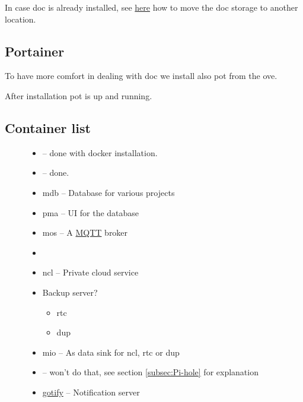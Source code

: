 In case \gls{doc} is already installed, see \href{https://www.reddit.com/r/OpenMediaVault/comments/fl40gf/moving_docker_storage/}{here}
how to move the \gls{doc} storage to another location.

\subsection{Portainer}

To have more comfort in dealing with \gls{doc} we install also \gls{pot}
from the \gls{ove}.


After installation \gls{pot} is up and running.


\subsection{Container list}

\begin{figure}[H]
    \begin{itemize}
        \item {}
              -- done with docker installation.
        \item {}
              -- done.
        \item \gls{mdb} -- Database for various projects
        \item \gls{pma} -- UI for the database
        \item \gls{mos} -- A \href{https://mqtt.org/}{MQTT} broker
        \item {}
        \item \gls{ncl} -- Private cloud service
        \item Backup server?
              \begin{itemize}
                  \item \gls{rtc}
                  \item \gls{dup}
              \end{itemize}
        \item \gls{mio} -- As data sink for \gls{ncl},
              \gls{rtc} or \gls{dup}
        \item {}
              -- won't do that, see section \ref{subsec:Pi-hole} for explanation
        \item \href{https://gotify.net/}{gotify} -- Notification server
    \end{itemize}
\end{figure}

